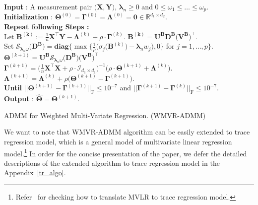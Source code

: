 \documentclass[alpha-refs]{wiley-article}
\begin{document}
\begin{algorithm}[t] 
    \textbf{Input} : A measurement pair $\big( \boldsymbol{X}, \boldsymbol{Y} \big)$, $\boldsymbol{\lambda}_{n} \geq 0$ and $0\leq \omega_{1} \leq \dots \leq \omega_{p}$. \\
    \textbf{Initialization} : $\boldsymbol{\Theta}^{(0)}=\boldsymbol{\Gamma}^{(0)}=\boldsymbol{\Lambda}^{(0)}=\boldsymbol{0} \in\mathbb{R}^{d_{1}\times d_{2}}$. \\
    {\bf Repeat following Steps :} \\
     Let $\boldsymbol{B^{(k)}}:=\frac{1}{n}\boldsymbol{X}^{\top}\boldsymbol{Y}-\boldsymbol{\Lambda}^{(k)}+\rho \cdot \boldsymbol{\Gamma}^{(k)}$.
    \quad $\boldsymbol{B^{(k)}}=\boldsymbol{U}^{\textbf{B}}\boldsymbol{D}^{\textbf{B}}\big(\boldsymbol{V}^{\textbf{B}}\big)^{\top}$. \\
    \qquad \qquad \qquad Set $\mathcal{S}_{\boldsymbol{\lambda}_{n}\omega}\big(\boldsymbol{D}^{\textbf{B}}\big)=\textbf{diag}\bigg\{ \max\bigg\{\frac{1}{\rho}\big(\sigma_{j}(\boldsymbol{B}^{(k)}\big)-\boldsymbol{\lambda}_{n} w_{j}\big),0 \bigg\}$ for $j=1,\dots,p \bigg\}$.  \\
    \qquad \qquad \qquad $\boldsymbol{\Theta}^{(k+1)} = \boldsymbol{U}^{\textbf{B}}\mathcal{S}_{\boldsymbol{\lambda}_{n}\omega}\big(\boldsymbol{D}^{\textbf{B}}\big)\big(\boldsymbol{V}^{\textbf{B}}\big)^{\top}$ \\
    $\boldsymbol{\Gamma}^{(k+1)} = \big( \frac{1}{n}\boldsymbol{X}^{\top}\boldsymbol{X}+\rho\cdot\mathcal{I}_{d_{1} \times d_{1}} \big)^{-1}\big( \rho \cdot \boldsymbol{\Theta}^{(k+1)} + \boldsymbol{\Lambda}^{(k)} \big).$\\
     $\boldsymbol{\Lambda}^{(k+1)} = \boldsymbol{\Lambda}^{(k)} + \rho\big( \boldsymbol{\Theta}^{(k+1)}-\boldsymbol{\Gamma}^{(k+1)} \big)$.\\
    {\bf Until} $|| \boldsymbol{\Theta}^{(k+1)}-\boldsymbol{\Gamma}^{(k+1)} ||_{\text{F}}\leq 10^{-7}$ and $|| \boldsymbol{\Gamma}^{(k+1)}-\boldsymbol{\Gamma}^{(k)} ||_{\text{F}}\leq 10^{-7}$. \\
    \textbf{Output} : $\widehat{\boldsymbol{\Theta}}=\boldsymbol{\Theta}^{(k+1)}$. 
    \caption{ADMM for Weighted Multi-Variate Regression. (WMVR-ADMM)}
    \label{alg:1}
\end{algorithm}

\begin{remark}
We want to note that WMVR-ADMM algorithm can be easily extended to trace regression model, which is a general model of multivariate linear regression model.\footnote{Refer~\citet{negahban2011estimation} for checking how to translate MVLR to trace regression model.}
In order for the concise presentation of the paper, we defer the detailed descriptions of the extended algorithm to trace regression model in the Appendix~\ref{tr_algo}.
\end{remark}
\end{document}
